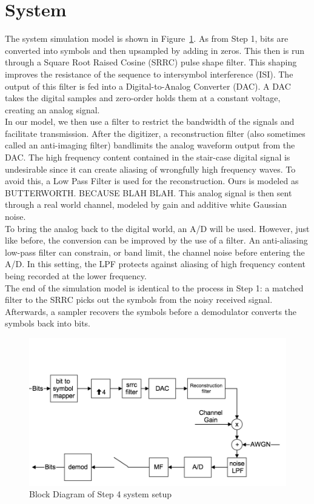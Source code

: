 \documentclass[]{article}
\begin{document}
\section{System}
\label{sec:system}
The system simulation model is shown in Figure~\ref{fig:step4}.  As from Step 1, bits are converted into symbols and then upsampled by adding in zeros.  This then is run through a Square Root Raised Cosine (SRRC) pulse shape filter.  This shaping improves the resistance of the sequence to intersymbol interference (ISI).  The output of this filter is fed into a Digital-to-Analog Converter (DAC).  A DAC takes the digital samples and zero-order holds them at a constant voltage, creating an analog signal.  \\
In our model, we then use a filter to restrict the bandwidth of the signals and facilitate transmission.  After the digitizer, a reconstruction filter (also sometimes called an anti-imaging filter) bandlimits the analog waveform output from the DAC.  The high frequency content contained in the stair-case digital signal is undesirable since it can create aliasing of wrongfully high frequency waves.  To avoid this, a Low Pass Filter is used for the reconstruction.  Ours is modeled as BUTTERWORTH.  BECAUSE BLAH BLAH.  This analog signal is then sent through a real world channel, modeled by gain and additive white Gaussian noise.  \\
To bring the analog back to the digital world, an A/D will be used.  However, just like before, the conversion can be improved by the use of a filter.  An anti-aliasing low-pass filter can constrain, or band limit, the channel noise before entering the A/D.  In this setting, the LPF  protects against aliasing of high frequency content being recorded at the lower frequency.\\
The end of the simulation model is identical to the process in Step 1: a matched filter to the SRRC picks out the symbols from the noisy received signal.  Afterwards, a sampler recovers the symbols before a demodulator converts the symbols back into bits.  

\begin{figure}[H]
\centering
\includegraphics[width=\textwidth]{step4.png}
\caption{Block Diagram of Step 4 system setup\label{fig:step4}}
\end{figure}
\end{document}
